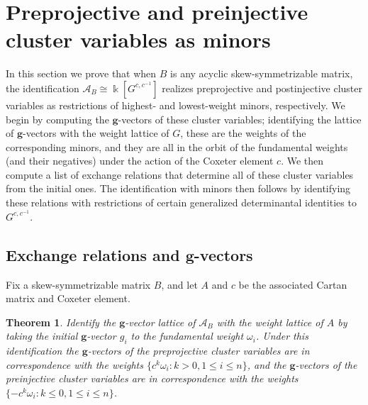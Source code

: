 \documentclass[12pt]{amsart}
\newcommand{\cA}{\mathcal{A}}
\newcommand{\kk}{\Bbbk}%
\newcommand{\bfg}{\mathbf{g}}
\newtheorem{theorem}{Theorem}[section]
\theoremstyle{remark}
\numberwithin{equation}{section}
\begin{document}
\section{Preprojective and preinjective cluster variables as minors}
In this section we prove that when $B$ is any acyclic skew-symmetrizable matrix, the identification $\cA_B \cong \kk[G^{c,c^{-1}}]$ realizes preprojective and postinjective cluster variables as restrictions of highest- and lowest-weight minors, respectively. We begin by computing the $\bfg$-vectors of these cluster variables; identifying the lattice of $\bfg$-vectors with the weight lattice of $G$, these are the weights of the corresponding minors, and they are all in the orbit of the fundamental weights (and their negatives) under the action of the Coxeter element $c$. We then compute a list of exchange relations that determine all of these cluster variables from the initial ones. The identification with minors then follows by identifying these relations with restrictions of certain generalized determinantal identities to $G^{c,c^{-1}}$.

\subsection{Exchange relations and $\bfg$-vectors}

Fix a skew-symmetrizable matrix $B$, and let $A$ and $c$ be the associated Cartan matrix and Coxeter element.

\begin{theorem}
Identify the $\bfg$-vector lattice of $\cA_B$ with the weight lattice of $A$ by taking the initial $\bfg$-vector $g_i$ to the fundamental weight $\omega_i$. Under this identification the $\bfg$-vectors of the preprojective cluster variables are in correspondence with the weights $\{c^k\omega_i : k > 0, 1 \leq i \leq n\}$, and the $\bfg$-vectors of the preinjective cluster variables are in correspondence with the weights $\{-c^k\omega_i : k \leq 0, 1 \leq i \leq n\}$.
\end{theorem}
\end{document}
